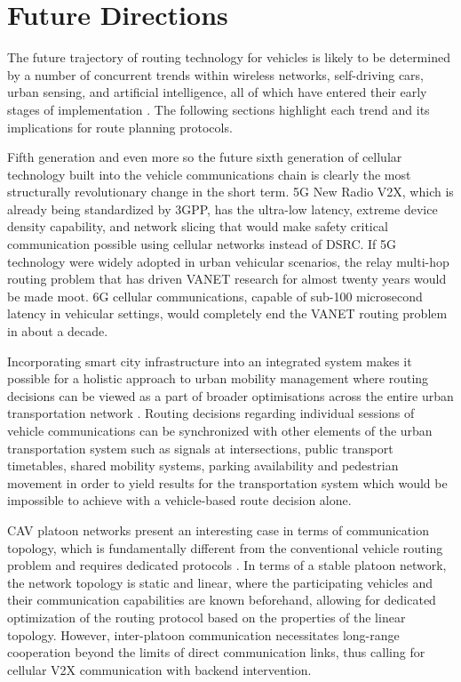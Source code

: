 \documentclass[12pt]{article}
\begin{document}
\section{Future Directions}

The future trajectory of routing technology for vehicles is likely to be determined by a number of concurrent trends within wireless networks, self-driving cars, urban sensing, and artificial intelligence, all of which have entered their early stages of implementation \cite{zheng2015heterogeneous}. The following sections highlight each trend and its implications for route planning protocols.

Fifth generation and even more so the future sixth generation of cellular technology built into the vehicle communications chain is clearly the most structurally revolutionary change in the short term. 5G New Radio V2X, which is already being standardized by 3GPP, has the ultra-low latency, extreme device density capability, and network slicing that would make safety critical communication possible using cellular networks instead of DSRC. If 5G technology were widely adopted in urban vehicular scenarios, the relay multi-hop routing problem that has driven VANET research for almost twenty years would be made moot. 6G cellular communications, capable of sub-100 microsecond latency in vehicular settings, would completely end the VANET routing problem in about a decade.

Incorporating smart city infrastructure into an integrated system makes it possible for a holistic approach to urban mobility management where routing decisions can be viewed as a part of broader optimisations across the entire urban transportation network \cite{naumov2007connectivity}. Routing decisions regarding individual sessions of vehicle communications can be synchronized with other elements of the urban transportation system such as signals at intersections, public transport timetables, shared mobility systems, parking availability and pedestrian movement in order to yield results for the transportation system which would be impossible to achieve with a vehicle-based route decision alone.

CAV platoon networks present an interesting case in terms of communication topology, which is fundamentally different from the conventional vehicle routing problem and requires dedicated protocols \cite{hartenstein2008tutorial}. In terms of a stable platoon network, the network topology is static and linear, where the participating vehicles and their communication capabilities are known beforehand, allowing for dedicated optimization of the routing protocol based on the properties of the linear topology. However, inter-platoon communication necessitates long-range cooperation beyond the limits of direct communication links, thus calling for cellular V2X communication with backend intervention.
\end{document}
